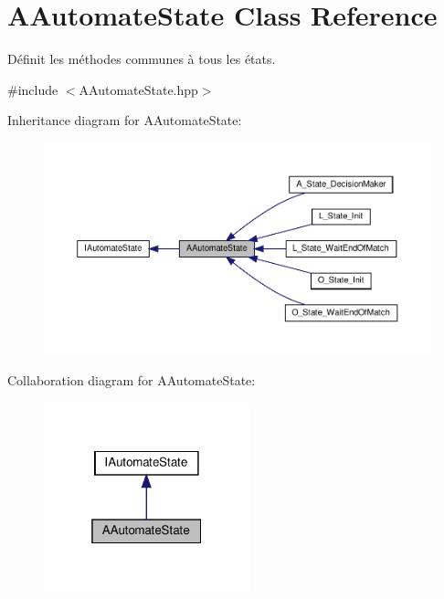 \hypertarget{classAAutomateState}{}\section{A\+Automate\+State Class Reference}
\label{classAAutomateState}


Définit les méthodes communes à tous les états.  




{\ttfamily \#include $<$A\+Automate\+State.\+hpp$>$}



Inheritance diagram for A\+Automate\+State\+:
\nopagebreak
\begin{figure}[H]
\begin{center}
\leavevmode
\includegraphics[width=350pt]{classAAutomateState__inherit__graph}
\end{center}
\end{figure}


Collaboration diagram for A\+Automate\+State\+:
\nopagebreak
\begin{figure}[H]
\begin{center}
\leavevmode
\includegraphics[width=169pt]{classAAutomateState__coll__graph}
\end{center}
\end{figure}
